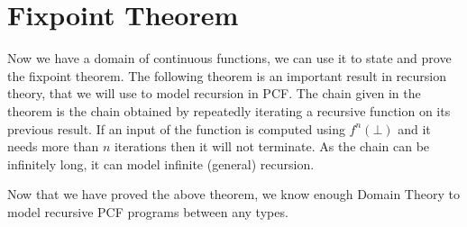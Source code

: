 \vspace{0.75cm}


\section{Fixpoint Theorem}\label{fixpoint}

Now we have a domain of continuous functions, we can use it to state and prove the fixpoint theorem. The following theorem is an important result in recursion theory, that we will use to model recursion in PCF. The chain given in the theorem is the chain obtained by repeatedly iterating a recursive function on its previous result. If an input of the function is computed using $f^n(\bot)$ and it needs more than $n$ iterations then it will not terminate. As the chain can be infinitely long, it can model infinite (general) recursion.

\vspace{0.5cm}



Now that we have proved the above theorem, we know enough Domain Theory to model recursive PCF programs between any types.